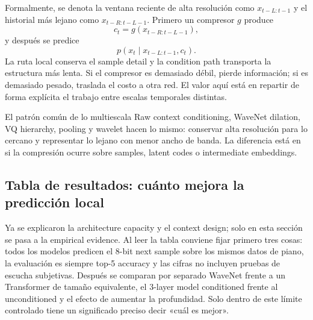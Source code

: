 Formalmente, se denota la ventana reciente de alta resolución como $x_{t-L:t-1}$ y el historial más lejano como $x_{t-R:t-L-1}$. Primero un compresor $g$ produce
\[
c_t=g(x_{t-R:t-L-1}),
\]
y después se predice
\[
p(x_t\mid x_{t-L:t-1},c_t).
\]
La ruta local conserva el sample detail y la condition path transporta la estructura más lenta. Si el compresor es demasiado débil, pierde información; si es demasiado pesado, traslada el costo a otra red. El valor aquí está en repartir de forma explícita el trabajo entre escalas temporales distintas.


\begin{importantbox}{El patrón común de lo multiescala}
Raw context conditioning, WaveNet dilation, VQ hierarchy, pooling y wavelet hacen lo mismo: conservar alta resolución para lo cercano y representar lo lejano con menor ancho de banda. La diferencia está en si la compresión ocurre sobre samples, latent codes o intermediate embeddings.
\end{importantbox}


\subsection{Tabla de resultados: cuánto mejora la predicción local}

Ya se explicaron la architecture capacity y el context design; solo en esta sección se pasa a la empirical evidence. Al leer la tabla conviene fijar primero tres cosas: todos los modelos predicen el 8-bit next sample sobre los mismos datos de piano, la evaluación es siempre top-5 accuracy y las cifras no incluyen pruebas de escucha subjetivas. Después se comparan por separado WaveNet frente a un Transformer de tamaño equivalente, el 3-layer model conditioned frente al unconditioned y el efecto de aumentar la profundidad. Solo dentro de este límite controlado tiene un significado preciso decir «cuál es mejor».

